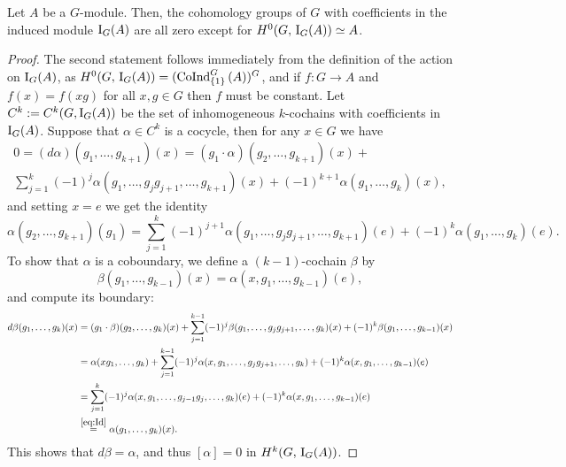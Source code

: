 \documentclass[a4paper, oneside]{memoir}
\begin{document}
\begin{proposition}\label{prop:IndMod}
    Let $A$ be a $G$-module. Then, the cohomology groups of $G$ with coefficients in the induced module $\mathrm{I}_{G}(A)$ are all zero except for $H^{0}( G, \, \mathrm{I}_{G}(A) )\simeq A$.
\end{proposition}

\begin{proof}
    The second statement follows immediately from the definition of the action on $\mathrm{I}_{G}(A)$, as $H^{0}( G, \, \mathrm{I}_{G}(A) )=(\operatorname{CoInd}^G_{\{1\}}{(A)})^G$, and if $f: G\to A$ and $f(x)=f(xg)$ for all $x, g\in G$ then $f$ must be constant.
    Let $C^k:=C^k(G,\mathrm{I}_{G}(A))$ be the set of inhomogeneous $k$-cochains with coefficients in $\mathrm{I}_{G}(A)$. Suppose that $\alpha\in C^{k}$ is a cocycle, then for any $x\in G$ we have
    \begin{align*}
        0 = (d\alpha)(g_1,\dots , g_{k+1})(x) = (g_1\cdot \alpha)(g_2,\dots , g_{k+1})(x) + \\
        \sum_{j=1}^{k} (-1)^j \alpha(g_1,\dots , g_j g_{j+1},\dots , g_{k+1})(x) + (-1)^{k+1} \alpha(g_1,\dots , g_k)(x),
    \end{align*}
    and setting $x=e$ we get the identity
    \begin{equation*}\label{eq:Id}
        \alpha(g_2, \dots , g_{k+1})(g_1) = \sum_{j=1}^{k} (-1)^{j+1} \alpha(g_1,\dots , g_j g_{j+1},\dots , g_{k+1})(e) + (-1)^k \alpha(g_1,\dots , g_k)(e).
    \end{equation*}
    To show that $\alpha$ is a coboundary, we define a $(k-1)$-cochain $\beta$ by
    \[
        \beta(g_1,\dots , g_{k-1})(x) = \alpha(x,g_1,\dots , g_{k-1})(e),
    \]
    and compute its boundary:
    \begin{align*}
        d\beta(g_1,\dots , g_k)(x) & = (g_1\cdot \beta)(g_2,\dots , g_k)(x) + \sum_{j=1}^{k-1} (-1)^j \beta(g_1,\dots , g_j g_{j+1},\dots , g_k)(x) + (-1)^k \beta(g_1,\dots , g_{k-1})(x) \\
                                   & = \alpha(x g_1,\dots , g_k) + \sum_{j=1}^{k-1} (-1)^j \alpha(x,g_1,\dots , g_j g_{j+1},\dots , g_k) + (-1)^k \alpha(x, g_1,\dots , g_{k-1})(e)        \\
                                   & = \sum_{j=1}^k (-1)^j \alpha(x,g_1,\dots , g_{j-1} g_j,\dots , g_k)(e) + (-1)^k \alpha(x,g_1,\dots , g_{k-1})(e)                                      \\
                                   & \overset{\eqref{eq:Id}}{=} \alpha(g_1,\dots , g_k)(x)
        .\end{align*}
    This shows that $d\beta=\alpha$, and thus $[\alpha]=0$ in $H^{k}( G, \, \mathrm{I}_{G}(A) )$.
\end{proof}
\end{document}
